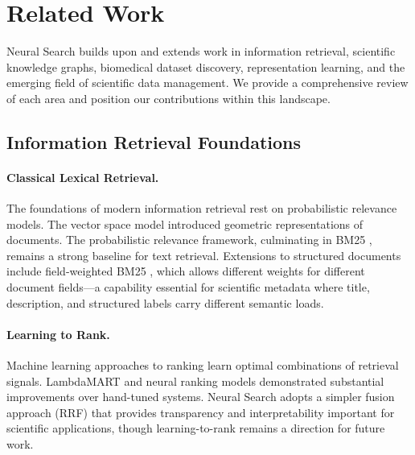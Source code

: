 \documentclass{article}
\theoremstyle{definition}
\begin{document}
\section{Related Work}
\label{sec:related}

Neural Search builds upon and extends work in information retrieval, scientific knowledge graphs, biomedical dataset discovery, representation learning, and the emerging field of scientific data management. We provide a comprehensive review of each area and position our contributions within this landscape.

\subsection{Information Retrieval Foundations}

\paragraph{Classical Lexical Retrieval.} The foundations of modern information retrieval rest on probabilistic relevance models. The vector space model \citep{salton1975vector} introduced geometric representations of documents. The probabilistic relevance framework, culminating in BM25 \citep{robertson2009probabilistic}, remains a strong baseline for text retrieval. Extensions to structured documents include field-weighted BM25 \citep{robertson2004simple}, which allows different weights for different document fields---a capability essential for scientific metadata where title, description, and structured labels carry different semantic loads.

\paragraph{Learning to Rank.} Machine learning approaches to ranking \citep{liu2009learning} learn optimal combinations of retrieval signals. LambdaMART \citep{burges2010ranknet} and neural ranking models \citep{guo2016deep} demonstrated substantial improvements over hand-tuned systems. Neural Search adopts a simpler fusion approach (RRF) that provides transparency and interpretability important for scientific applications, though learning-to-rank remains a direction for future work.
\end{document}
